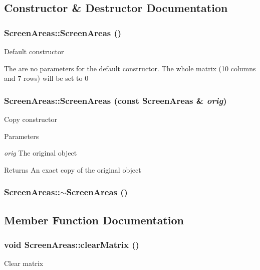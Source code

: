 \subsection{Constructor \& Destructor Documentation}
\hypertarget{classScreenAreas_aca5c595f504dffec5dd57340978f581e}{
\subsubsection[{ScreenAreas}]{\setlength{\rightskip}{0pt plus 5cm}ScreenAreas::ScreenAreas ()}}
\label{classScreenAreas_aca5c595f504dffec5dd57340978f581e}
Default constructor

The are no parameters for the default constructor. The whole matrix (10 columns and 7 rows) will be set to 0 \hypertarget{classScreenAreas_adbe7305f6170ebb529f0df7f2fd7359a}{
\subsubsection[{ScreenAreas}]{\setlength{\rightskip}{0pt plus 5cm}ScreenAreas::ScreenAreas (const {\bf ScreenAreas} \& {\em orig})}}
\label{classScreenAreas_adbe7305f6170ebb529f0df7f2fd7359a}
Copy constructor 
\begin{DoxyParams}{Parameters}
\item[{\em orig}]The original object\end{DoxyParams}
\begin{DoxyReturn}{Returns}
An exact copy of the original object 
\end{DoxyReturn}
\hypertarget{classScreenAreas_aa7631a95539bbe1bffeffa7262e739f6}{
\subsubsection[{$\sim$ScreenAreas}]{\setlength{\rightskip}{0pt plus 5cm}ScreenAreas::$\sim$ScreenAreas ()}}
\label{classScreenAreas_aa7631a95539bbe1bffeffa7262e739f6}


\subsection{Member Function Documentation}
\hypertarget{classScreenAreas_a53621c90e26c34a43750eb6fc2c47f2b}{
\subsubsection[{clearMatrix}]{\setlength{\rightskip}{0pt plus 5cm}void ScreenAreas::clearMatrix ()}}
\label{classScreenAreas_a53621c90e26c34a43750eb6fc2c47f2b}
Clear matrix


